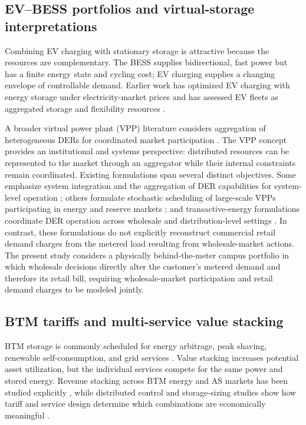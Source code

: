\documentclass[final,5p,times]{elsarticle}
\begin{document}
\subsection{EV--BESS portfolios and virtual-storage interpretations}
Combining EV charging with stationary storage is attractive because the resources are complementary. The BESS supplies bidirectional, fast power but has a finite energy state and cycling cost; EV charging supplies a changing envelope of controllable demand. Earlier work has optimized EV charging with energy storage under electricity-market prices \cite{jin2013evstorage} and has assessed EV fleets as aggregated storage and flexibility resources \cite{mills2018evstorage}.

A broader virtual power plant (VPP) literature considers aggregation of heterogeneous DERs for coordinated market participation \cite{pudjianto2007vpp} \cite{zamani2016vpp} \cite{qiu2017transactive}. The VPP concept provides an institutional and systems perspective: distributed resources can be represented to the market through an aggregator while their internal constraints remain coordinated. Existing formulations span several distinct objectives. Some emphasize system integration and the aggregation of DER capabilities for system-level operation \cite{pudjianto2007vpp}; others formulate stochastic scheduling of large-scale VPPs participating in energy and reserve markets \cite{zamani2016vpp}; and transactive-energy formulations coordinate DER operation across wholesale and distribution-level settings \cite{qiu2017transactive}. In contrast, these formulations do not explicitly reconstruct commercial retail demand charges from the metered load resulting from wholesale-market actions. The present study considers a physically behind-the-meter campus portfolio in which wholesale decisions directly alter the customer's metered demand and therefore its retail bill, requiring wholesale-market participation and retail demand charges to be modeled jointly.

\subsection{BTM tariffs and multi-service value stacking}
BTM storage is commonly scheduled for energy arbitrage, peak shaving, renewable self-consumption, and grid services \cite{raoufat2018bess} \cite{wu2017analytical} \cite{chen2021valueStacking}. Value stacking increases potential asset utilization, but the individual services compete for the same power and stored energy. Revenue stacking across BTM energy and AS markets has been studied explicitly \cite{seward2022revenueStacking}, while distributed control and storage-sizing studies show how tariff and service design determine which combinations are economically meaningful \cite{karandeh2022distributed} \cite{zhang2024btmsizing}.
\end{document}
